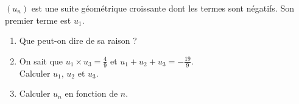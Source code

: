\documentclass[11pt]{article}
\begin{document}
\begin{exercice}[3][Problème]
\( (u_n) \) est une suite géométrique croissante dont les termes sont négatifs. Son premier terme est \( u_1 \).
    \begin{enumerate}
        \item Que peut-on dire de sa raison ?
        \item On sait que \( u_1 \times u_3 = \frac{4}{9} \) et \( u_1
        + u_2 + u_3 = -\frac{19}{9} \). \\
        Calculer \( u_1 \), \( u_2 \) et \( u_3 \).
        \item Calculer \( u_n \) en fonction de \( n \).
        \end{enumerate}
\end{exercice}
\end{document}
